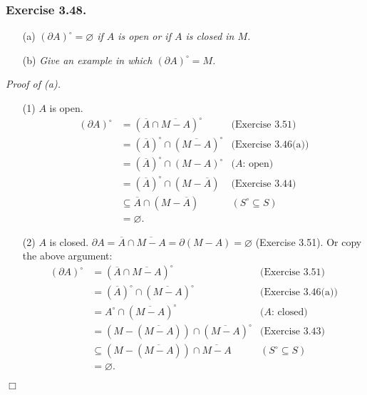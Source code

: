 \documentclass{article}
\begin{document}
\subsubsection*{Exercise 3.48.}
\begin{enumerate}
\item[(a)]
\emph{$(\partial A)^{\circ} = \varnothing$ if $A$ is open or if $A$ is closed in $M$. }
\item[(b)]
\emph{Give an example in which $(\partial A)^{\circ} = M$. } \\
\end{enumerate}

\emph{Proof of (a).}
\begin{enumerate}
\item[(1)]
$A$ is open.
\begin{align*}
(\partial A)^{\circ}
&= (\overline{A} \cap \overline{M-A})^{\circ}
  &\text{(Exercise 3.51)} \\
&= (\overline{A})^{\circ} \cap (\overline{M-A})^{\circ}
  &\text{(Exercise 3.46(a))} \\
&= (\overline{A})^{\circ} \cap (M-A)^{\circ}
  &\text{($A$: open)} \\
&= (\overline{A})^{\circ} \cap (M - \overline{A})
  &\text{(Exercise 3.44)} \\
&\subseteq \overline{A} \cap (M - \overline{A})
  &(S^{\circ} \subseteq S) \\
&= \varnothing.
\end{align*}
\item[(2)]
$A$ is closed.
$\partial A
= \overline{A} \cap \overline{M-A}
= \partial (M - A)
= \varnothing$ (Exercise 3.51).
Or copy the above argument:
\begin{align*}
(\partial A)^{\circ}
&= (\overline{A} \cap \overline{M-A})^{\circ}
  &\text{(Exercise 3.51)} \\
&= (\overline{A})^{\circ} \cap (\overline{M-A})^{\circ}
  &\text{(Exercise 3.46(a))} \\
&= A^{\circ} \cap (\overline{M-A})^{\circ}
  &\text{($A$: closed)} \\
&= (M - (\overline{M-A})) \cap (\overline{M-A})^{\circ}
  &\text{(Exercise 3.43)} \\
&\subseteq (M - (\overline{M-A})) \cap \overline{M-A}
  &(S^{\circ} \subseteq S) \\
&= \varnothing.
\end{align*}

\end{enumerate}
$\Box$ \\
\end{document}
